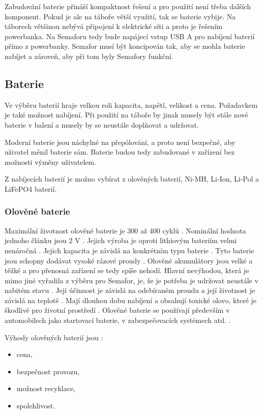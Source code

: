Zabudování baterie přináší kompaktnost řešení a pro použití není třeba dalších komponent. Pokud je ale na táboře větší využití, tak se baterie vybije.
Na táborech většinou nebývá připojení k elektrické síti a proto je řešením powerbanka. Na Semaforu tedy bude napájecí vstup USB A pro nabíjení baterií
přímo z powerbanky. Semafor musí být koncipován tak, aby se mohla baterie nabíjet a zároveň, aby při tom byly Semafory funkční.

\subsection{Baterie}
Ve výběru baterií hraje velkou roli kapacita, napětí, velikost a cena. Požadavkem je také možnost nabíjení. Při použití na táboře by jinak musely být stále 
nové baterie v balení a musely by se neustále doplňovat a udržovat.

Moderní baterie jsou náchylné na přepólování, a proto není bezpečné, aby uživatel měnil baterie sám. Baterie budou tedy zabudované v zařízení bez možnosti 
výměny uživatelem. 


Z nabíjecích baterií je možno vybírat z olověných baterií, Ni-MH, Li-Ion, Li-Pol a LiFePO4 baterií.

\subsubsection{Olověné baterie}
Maximální životnost olověné baterie je 300 až 400 cyklů \cite{LiFePO4_malina}. Nominální hodnota jednoho článku jsou 2 V \cite{olovene}. Jejich výroba je oproti
lithiovým bateriím velmi nenáročná \cite{olovene}. Jejich kapacita je závislá na konkrétním typu baterie \cite{olovene}. Tyto baterie jsou schopny dodávat vysoké
rázové proudy \cite{akumulatory}. Olověné akumulátory jsou velké a těžké a pro přenosná zařízení se tedy spíše nehodí. Hlavní nevýhodou, která je mimo jiné vyřadila 
z výběru pro Semafor, je, že je potřeba je udržovat neustále v nabitém stavu \cite{olovene}. Její účinnost je závislá na odebíraném proudu a její životnost je závislá 
na teplotě \cite{olovene}. Mají dlouhou dobu nabíjení a obsahují toxické olovo, které je škodlivé pro životní prostředí \cite{olovene}. Olověné baterie se používají 
především v automobilech jako startovací baterie, v zabezpečovacích systémech atd. \cite{olovene}.

Výhody olověných baterií jsou \cite{olovene}:
\begin{itemize}
  \item cena,
  \item bezpečnost provozu,
  \item možnost recyklace,
  \item spolehlivost. 
\end{itemize}

